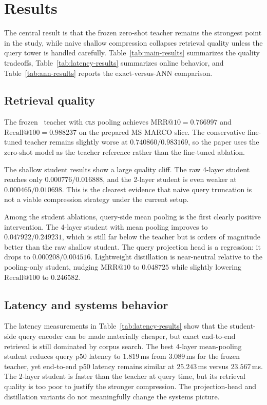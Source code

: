 \section{Results}

The central result is that the frozen zero-shot teacher remains the strongest point in the study, while naive shallow compression collapses retrieval quality unless the query tower is handled carefully. Table~\ref{tab:main-results} summarizes the quality tradeoffs, Table~\ref{tab:latency-results} summarizes online behavior, and Table~\ref{tab:ann-results} reports the exact-versus-ANN comparison.

\subsection{Retrieval quality}

The frozen \bgebase\ teacher with \textsc{cls} pooling achieves $\mathrm{MRR}@10 = 0.766997$ and $\mathrm{Recall}@100 = 0.988237$ on the prepared MS MARCO slice. The conservative fine-tuned teacher remains slightly worse at $0.740860 / 0.983169$, so the paper uses the zero-shot model as the teacher reference rather than the fine-tuned ablation.

The shallow student results show a large quality cliff. The raw 4-layer student reaches only $0.000776 / 0.016888$, and the 2-layer student is even weaker at $0.000465 / 0.010698$. This is the clearest evidence that naive query truncation is not a viable compression strategy under the current setup.

Among the student ablations, query-side mean pooling is the first clearly positive intervention. The 4-layer student with mean pooling improves to $0.047922 / 0.249231$, which is still far below the teacher but is orders of magnitude better than the raw shallow student. The query projection head is a regression: it drops to $0.000208 / 0.004516$. Lightweight distillation is near-neutral relative to the pooling-only student, nudging $\mathrm{MRR}@10$ to $0.048725$ while slightly lowering $\mathrm{Recall}@100$ to $0.246582$.



\subsection{Latency and systems behavior}

The latency measurements in Table~\ref{tab:latency-results} show that the student-side query encoder can be made materially cheaper, but exact end-to-end retrieval is still dominated by corpus search. The best 4-layer mean-pooling student reduces query p50 latency to $1.819$\,ms from $3.089$\,ms for the frozen teacher, yet end-to-end p50 latency remains similar at $25.243$\,ms versus $23.567$\,ms. The 2-layer student is faster than the teacher at query time, but its retrieval quality is too poor to justify the stronger compression. The projection-head and distillation variants do not meaningfully change the systems picture.

